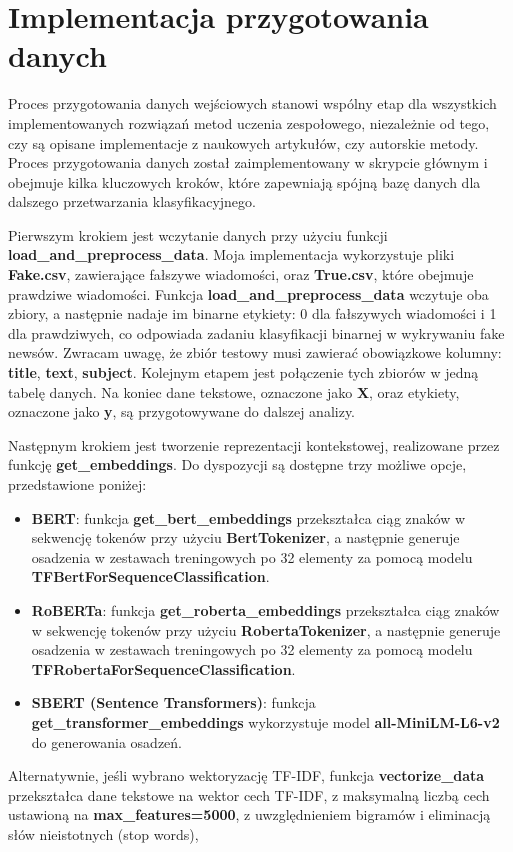 \section{Implementacja przygotowania danych}

Proces przygotowania danych wejściowych stanowi wspólny etap dla wszystkich implementowanych rozwiązań metod uczenia zespołowego, niezależnie od tego, czy są opisane implementacje z naukowych artykułów, czy autorskie metody. Proces przygotowania danych został zaimplementowany w skrypcie głównym i obejmuje kilka kluczowych kroków, które zapewniają spójną bazę danych dla dalszego przetwarzania klasyfikacyjnego.

Pierwszym krokiem jest wczytanie danych przy użyciu funkcji \newline \textbf{load\_and\_preprocess\_data}. Moja implementacja wykorzystuje pliki \textbf{Fake.csv}, zawierające fałszywe wiadomości, oraz \textbf{True.csv}, które obejmuje prawdziwe wiadomości. Funkcja \textbf{load\_and\_preprocess\_data} wczytuje oba zbiory, a następnie nadaje im binarne etykiety: 0 dla fałszywych wiadomości i 1 dla prawdziwych, co odpowiada zadaniu klasyfikacji binarnej w wykrywaniu fake newsów. Zwracam uwagę, że zbiór testowy musi zawierać obowiązkowe kolumny: \textbf{title}, \textbf{text}, \textbf{subject}. Kolejnym etapem jest połączenie tych zbiorów w jedną tabelę danych. Na koniec dane tekstowe, oznaczone jako \textbf{X}, oraz etykiety, oznaczone jako \textbf{y}, są przygotowywane do dalszej analizy.

Następnym krokiem jest tworzenie reprezentacji kontekstowej, realizowane przez funkcję
\textbf{get\_embeddings}.
Do dyspozycji są dostępne trzy możliwe opcje, przedstawione poniżej:
\begin{itemize}
	\item \textbf{BERT}: funkcja
	      \textbf{get\_bert\_embeddings}
	      przekształca ciąg znaków w sekwencję tokenów przy użyciu
	      \textbf{BertTokenizer},
	      a następnie generuje osadzenia w zestawach treningowych po 32 elementy za pomocą modelu \newline \textbf{TFBertForSequenceClassification}.
	\item \textbf{RoBERTa}: funkcja
	      \textbf{get\_roberta\_embeddings}
	      przekształca ciąg znaków w sekwencję tokenów przy użyciu
	      \newline \textbf{RobertaTokenizer}, a następnie generuje osadzenia w zestawach treningowych po 32 elementy za pomocą modelu \textbf{TFRobertaForSequenceClassification}.
	\item \textbf{SBERT (Sentence Transformers)}: funkcja
	      \textbf{get\_transformer\_embeddings}
	      wykorzystuje model
	      \textbf{all-MiniLM-L6-v2}
	      do generowania osadzeń.
\end{itemize}
Alternatywnie, jeśli wybrano wektoryzację TF-IDF, funkcja \textbf{vectorize\_data} \newline
przekształca dane tekstowe na wektor cech TF-IDF, z maksymalną liczbą cech ustawioną na
\textbf{max\_features=5000},
z uwzględnieniem bigramów i eliminacją słów nieistotnych (stop words),

